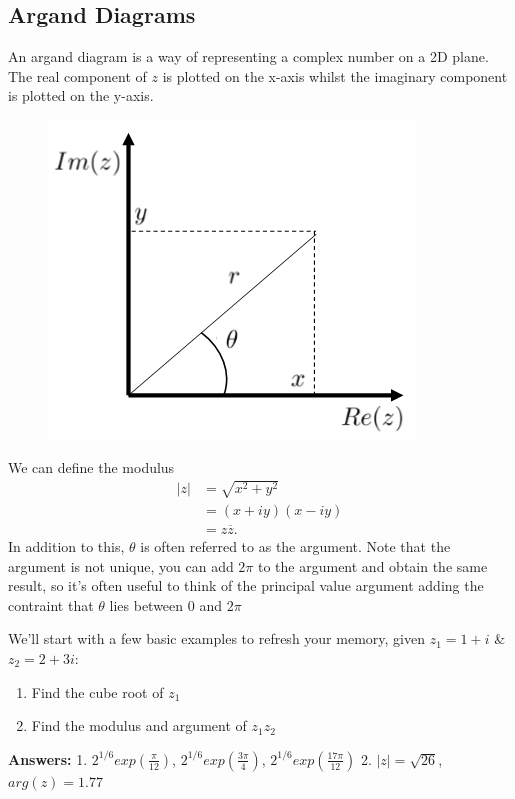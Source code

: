 \subsection{Argand Diagrams}
An argand diagram is a way of representing a complex number on a 2D plane.
 The real component of $z$ is plotted on the x-axis whilst the imaginary component is plotted on the y-axis.
 \begin{minipage}[t]{0.47\linewidth}
 	\begin{figure}[H]
 		\centering
 		\includegraphics[width=\linewidth]{complex/argand}
 		\captionsetup{font=small} 	
 	\end{figure} 
 \end{minipage}
 \hspace{0.6cm}
%
\begin{minipage}[t]{0.47\linewidth}
	\vspace{1cm}
	We can define the modulus 
	\begin{align*}
	|z| &= \sqrt{x^2+y^2} \\
	&= (x+iy)(x-iy) \\
	&= z\overline{z}.
	\end{align*}
	In addition to this, $\theta$ is often referred to as the argument.
	 Note that the argument is not unique, you can add $2\pi$ to the argument and obtain the same result, so it's often useful to think of the principal value argument adding the contraint that $\theta$ lies between $0$ and $2\pi$
\end{minipage}
\begin{examples}
	We'll start with a few basic examples to refresh your memory, given $z_1=1+i$ \& $z_2=2+3i$:
	\begin{enumerate}
		\item Find the cube root of $z_1$
		\item Find the modulus and argument of $z_1z_2$
	\end{enumerate}
\textbf{Answers:} 1. $2^{1/6}exp(\frac{\pi}{12})$, $2^{1/6}exp(\frac{3\pi}{4})$, $2^{1/6}exp(\frac{17\pi}{12})$ \hspace{0.5cm}
2. $|z| = \sqrt{26}$, $arg(z)=1.77$
\end{examples}
